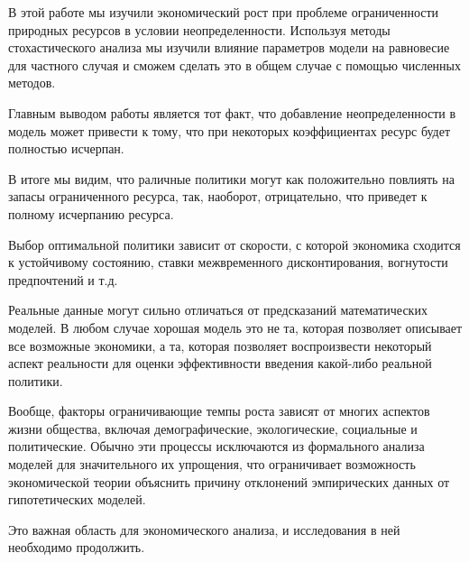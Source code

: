 \documentclass[12pt,a4paper, oneside]{extreport}
\begin{document}
В этой работе мы изучили экономический рост при проблеме ограниченности природных ресурсов  в условии  неопределенности.
Используя методы  стохастического анализа мы изучили влияние параметров модели на равновесие для частного случая и сможем сделать это в общем случае с   помощью численных  методов. 



Главным  выводом работы является тот  факт, что добавление неопределенности в модель может привести к  тому, что  при некоторых коэффициентах ресурс будет полностью  исчерпан.    


В итоге мы видим, что раличные  политики могут как положительно повлиять  на запасы ограниченного ресурса, так, наоборот, отрицательно, что приведет к полному исчерпанию ресурса.  

Выбор оптимальной политики зависит от скорости, с которой экономика  сходится  к устойчивому состоянию, ставки межвременного дисконтирования, вогнутости предпочтений и т.д.  

Реальные данные могут сильно отличаться от предсказаний  математических моделей. В любом случае хорошая модель это не та, которая позволяет   описывает все возможные экономики,  а та,  которая позволяет   воспроизвести некоторый аспект  реальности для оценки эффективности введения какой-либо реальной политики.


Вообще, факторы ограничивающие темпы   роста зависят от   многих  аспектов жизни общества,  включая демографические, экологические, социальные  и политические. Обычно эти процессы исключаются из формального анализа моделей для  значительного их  упрощения, что ограничивает  возможность экономической теории объяснить причину  отклонений  эмпирических данных от гипотетических моделей.  

Это важная область  для экономического анализа, и исследования в ней необходимо продолжить.


 






\nocite{*}  %

\begingroup
{}
\printbibliography[title = {Список литературы}]
\endgroup
\end{document}
